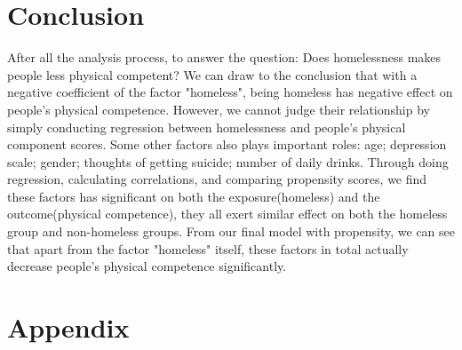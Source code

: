 \documentclass{report}
\begin{document}
\section{Conclusion}
After all the analysis process, to answer the question: Does homelessness makes people less physical competent? We can draw to the conclusion that with a negative coefficient of the factor "homeless", being homeless has negative effect on people's physical competence. However, we cannot judge their relationship by simply conducting regression between homelessness and people's physical component scores. Some other factors also plays important roles: age; depression scale; gender; thoughts of getting suicide; number of daily drinks. Through doing regression, calculating correlations, and comparing propensity scores, we find these factors has significant on both the exposure(homeless) and the outcome(physical competence), they all exert similar effect on both the homeless group and non-homeless groups. From our final model with propensity, we can see that apart from the factor "homeless" itself, these factors in total actually decrease people's physical competence significantly. 
\newpage
\section{Appendix}
\end{document}
